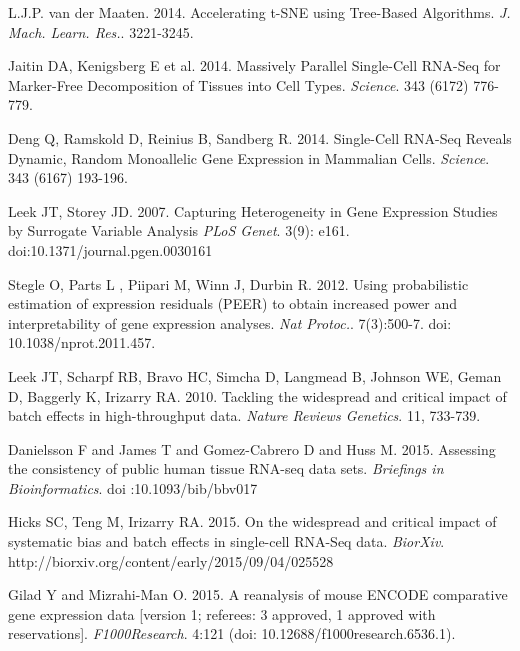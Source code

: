 \documentclass[10pt,letterpaper]{article}
\begin{document}
\begin{thebibliography}{9}
L.J.P. van der Maaten. 2014.
Accelerating t-SNE using Tree-Based Algorithms.
\textit{J. Mach. Learn. Res.}.  3221-3245.



Jaitin DA,  Kenigsberg E et al. 2014.
Massively Parallel Single-Cell RNA-Seq for Marker-Free Decomposition of Tissues into Cell Types.
\textit{Science}. 343 (6172) 776-779.

Deng Q,  Ramskold D,  Reinius B,  Sandberg R. 2014.
Single-Cell RNA-Seq Reveals Dynamic, Random Monoallelic Gene Expression in Mammalian Cells.
\textit{Science}.  343 (6167) 193-196.


Leek JT,  Storey JD. 2007.
Capturing Heterogeneity in Gene Expression Studies by Surrogate Variable Analysis
\textit{PLoS Genet}. 3(9): e161. doi:10.1371/journal.pgen.0030161

Stegle O,  Parts L ,  Piipari M,  Winn J,  Durbin R. 2012.
Using probabilistic estimation of expression residuals (PEER) to obtain increased power and interpretability of gene expression analyses.
\textit{Nat Protoc.}. 7(3):500-7. doi: 10.1038/nprot.2011.457.


Leek JT,  Scharpf RB,  Bravo HC,  Simcha D,  Langmead B,  Johnson WE,  Geman D,  Baggerly K,  Irizarry RA. 2010.
Tackling the widespread and critical impact of batch effects in high-throughput data.
\textit{Nature Reviews Genetics}. 11, 733-739.

Danielsson F and James T and Gomez-Cabrero D and Huss  M. 2015.
Assessing the consistency of public human tissue RNA-seq data sets.
\textit{Briefings in Bioinformatics}.  doi :10.1093/bib/bbv017


Hicks SC, Teng M, Irizarry RA. 2015.
On the widespread and critical impact of systematic bias and batch effects in single-cell RNA-Seq data.
\textit{BiorXiv}. http://biorxiv.org/content/early/2015/09/04/025528

Gilad Y and Mizrahi-Man O. 2015.
A reanalysis of mouse ENCODE comparative gene expression data [version 1; referees: 3 approved, 1 approved with reservations].
\textit{F1000Research}. 4:121 (doi: 10.12688/f1000research.6536.1).



\end{thebibliography}
\end{document}
